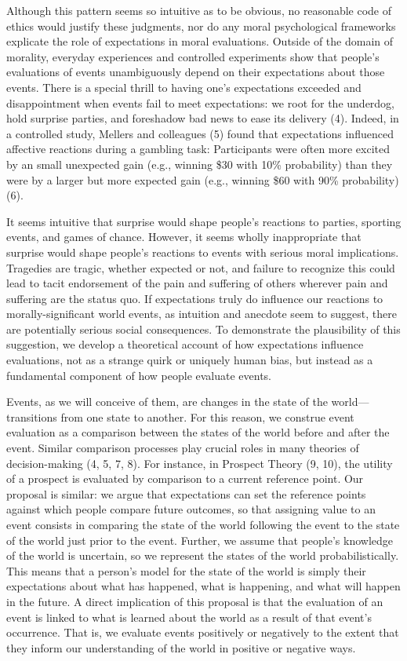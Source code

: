 \documentclass[9pt,twocolumn,twoside,]{pnas-new}
\begin{document}
Although this pattern seems so intuitive as to be obvious, no reasonable
code of ethics would justify these judgments, nor do any moral
psychological frameworks explicate the role of expectations in moral
evaluations. Outside of the domain of morality, everyday experiences and
controlled experiments show that people's evaluations of events
unambiguously depend on their expectations about those events. There is
a special thrill to having one's expectations exceeded and
disappointment when events fail to meet expectations: we root for the
underdog, hold surprise parties, and foreshadow bad news to ease its
delivery (4). Indeed, in a controlled study, Mellers and colleagues (5)
found that expectations influenced affective reactions during a gambling
task: Participants were often more excited by an small unexpected gain
(e.g., winning \$30 with 10\% probability) than they were by a larger
but more expected gain (e.g., winning \$60 with 90\% probability) (6).

It seems intuitive that surprise would shape people's reactions to
parties, sporting events, and games of chance. However, it seems wholly
inappropriate that surprise would shape people's reactions to events
with serious moral implications. Tragedies are tragic, whether expected
or not, and failure to recognize this could lead to tacit endorsement of
the pain and suffering of others wherever pain and suffering are the
status quo. If expectations truly do influence our reactions to
morally-significant world events, as intuition and anecdote seem to
suggest, there are potentially serious social consequences. To
demonstrate the plausibility of this suggestion, we develop a
theoretical account of how expectations influence evaluations, not as a
strange quirk or uniquely human bias, but instead as a fundamental
component of how people evaluate events.

Events, as we will conceive of them, are changes in the state of the
world---transitions from one state to another. For this reason, we
construe event evaluation as a comparison between the states of the
world before and after the event. Similar comparison processes play
crucial roles in many theories of decision-making (4, 5, 7, 8). For
instance, in Prospect Theory (9, 10), the utility of a prospect is
evaluated by comparison to a current reference point. Our proposal is
similar: we argue that expectations can set the reference points against
which people compare future outcomes, so that assigning value to an
event consists in comparing the state of the world following the event
to the state of the world just prior to the event. Further, we assume
that people's knowledge of the world is uncertain, so we represent the
states of the world probabilistically. This means that a person's model
for the state of the world is simply their expectations about what has
happened, what is happening, and what will happen in the future. A
direct implication of this proposal is that the evaluation of an event
is linked to what is learned about the world as a result of that event's
occurrence. That is, we evaluate events positively or negatively to the
extent that they inform our understanding of the world in positive or
negative ways.
\end{document}
